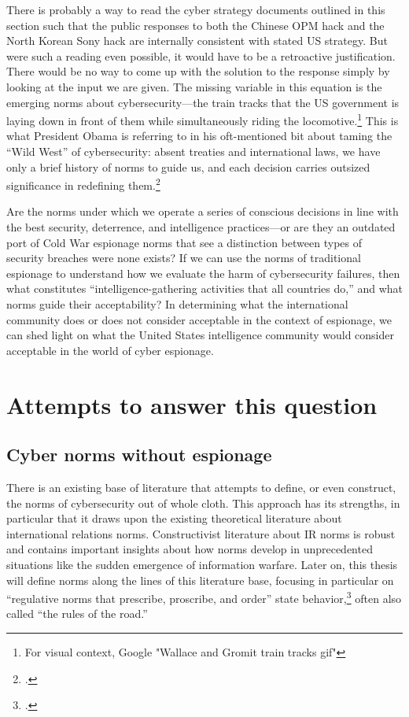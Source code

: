 \documentclass{report}
\begin{document}
\begin{refsegment}
There is probably a way to read the cyber strategy documents outlined in this section such that the public responses to both the Chinese OPM hack and the North Korean Sony hack are internally consistent with stated US strategy. But were such a reading even possible, it would have to be a retroactive justification. There would be no way to come up with the solution to the response simply by looking at the input we are given. The missing variable in this equation is the emerging norms about cybersecurity---the train tracks that the US government is laying down in front of them while simultaneously riding the locomotive.\footnote{For visual context, Google "Wallace and Gromit train tracks gif"} This is what President Obama is referring to in his oft-mentioned bit about taming the ``Wild West'' of cybersecurity: absent treaties and international laws, we have only a brief history of norms to guide us, and each decision carries outsized significance in redefining them.\footcite{sanger_u.s._2017}

Are the norms under which we operate a series of conscious decisions in line with the best security, deterrence, and intelligence practices---or are they an outdated port of Cold War espionage norms that see a distinction between types of security breaches were none exists? If we can use the norms of traditional espionage to understand how we evaluate the harm of cybersecurity failures, then what constitutes ``intelligence-gathering activities that all countries do,'' and what norms guide their acceptability? In determining what the international community does or does not consider acceptable in the context of espionage, we can shed light on what the United States intelligence community would consider acceptable in the world of cyber espionage.





\section{Attempts to answer this question}
\subsection{Cyber norms without espionage}
There is an existing base of literature that attempts to define, or even construct, the norms of cybersecurity out of whole cloth. This approach has its strengths, in particular that it draws upon the existing theoretical literature about international relations norms. Constructivist literature about IR norms is robust and contains important insights about how norms develop in unprecedented situations like the sudden emergence of information warfare. Later on, this thesis will define norms along the lines of this literature base, focusing in particular on ``regulative norms that prescribe, proscribe, and order'' state behavior,\footcite{bjorkdahl_norms_2002} often also called ``the rules of the road.''


\end{refsegment}
\end{document}

